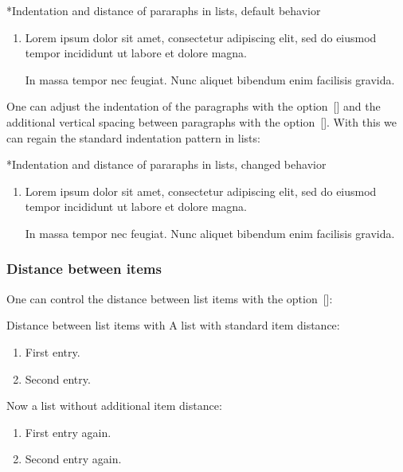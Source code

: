 \begin{showlatex}*{Indentation and distance of pararaphs in lists, default behavior}
\begin{enumerate}
  \item
    Lorem ipsum dolor sit amet, consectetur adipiscing elit, sed do eiusmod tempor incididunt ut labore et dolore magna.
    
    In massa tempor nec feugiat. Nunc aliquet bibendum enim facilisis gravida.
\end{enumerate}
\end{showlatex}

One can adjust the indentation of the paragraphs with the option~[\optname] and the additional vertical spacing between paragraphs with the option~[\optname].
With this we can regain the standard indentation pattern in lists:

\begin{showlatex}*{Indentation and distance of pararaphs in lists, changed behavior}
\begin{enumerate}[listparindent = \parindent, parsep = 0pt]
  \item
    Lorem ipsum dolor sit amet, consectetur adipiscing elit, sed do eiusmod tempor incididunt ut labore et dolore magna.
    
    In massa tempor nec feugiat. Nunc aliquet bibendum enim facilisis gravida.
\end{enumerate}
\end{showlatex}

\subsubsection{Distance between items}

One can control the distance between list items with the option~[\optname]:

\begin{showlatex}{Distance between list items with }
A list with standard item distance:
\begin{enumerate}
  \item
    First entry.
  \item
    Second entry.
\end{enumerate}
Now a list without additional item distance:
\begin{enumerate}[itemsep = 0pt]
  \item
    First entry again.
  \item
    Second entry again.
\end{enumerate}
\end{showlatex}


